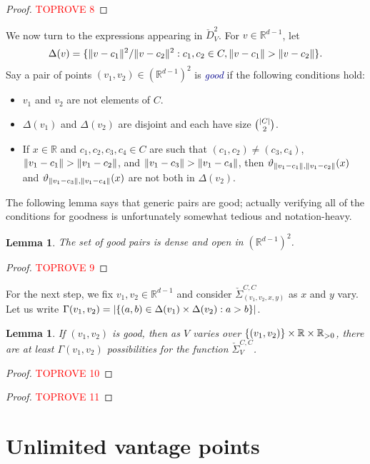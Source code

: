 \documentclass[11pt]{amsart}
\newtheorem{lemma}[theorem]{Lemma}
\theoremstyle{definition}
\DeclarePairedDelimiter{\set}{\{}{\}}
\DeclarePairedDelimiter{\abs}{\lvert}{\rvert}
\DeclarePairedDelimiter{\Abs}{\lVert}{\rVert}
\newcommand{\RR}{\mathbb{R}}
\newcommand{\dfn}[1]{\textcolor{darkblue}{\emph{#1}}}
\begin{document}
\begin{proof}\textcolor{red}{TOPROVE 8}\end{proof}

We now turn to the expressions appearing in $\check D^2_V$.  For $v \in \RR^{d-1}$, let \[\Delta(v) = \set{\Abs{v - c_1}^2/\Abs{v - c_2}^2 : c_1, c_2 \in C, \Abs{v - c_1} > \Abs{v - c_2}}.\] 
Say a pair of points $(v_1, v_2) \in (\RR^{d-1})^2$ is \dfn{good} if the following conditions hold:
\begin{itemize}
    \item $v_1$ and $v_2$ are not elements of $C$.
    \item $\Delta(v_1)$ and $\Delta(v_2)$ are disjoint and each have size $\binom{\abs{C}}{2}$.
    \item If $x \in \RR$ and $c_1, c_2, c_3, c_4 \in C$ are such that $(c_1,c_2) \neq (c_3,c_4)$, $\Abs{v_1 - c_1} > \Abs{v_1 - c_2}$, and $\Abs{v_1 - c_3} > \Abs{v_1 - c_4}$, then $\vartheta_{\Abs{v_1 - c_1},\Abs{v_1 - c_2}}(x)$ and $\vartheta_{\Abs{v_1 - c_3},\Abs{v_1 - c_4}}(x)$ are not both in $\Delta(v_2)$. 
\end{itemize}
The following lemma says that generic pairs are good; actually verifying all of the conditions for goodness is unfortunately somewhat tedious and notation-heavy.
\begin{lemma} \label{lem:denseopen}
The set of good pairs is dense and open in $(\RR^{d-1})^2$.
\end{lemma}
\begin{proof}\textcolor{red}{TOPROVE 9}\end{proof}

For the next step, we fix $v_1, v_2 \in \RR^{d-1}$ and consider $\check \Sigma^{C,C}_{(v_1,v_2,x,y)}$ as $x$ and $y$ vary. Let us write $\Gamma(v_1,v_2)= \abs{\set{(a,b)\in \Delta(v_1) \times \Delta(v_2) : a > b}}$.
\begin{lemma} \label{lem:gdd}
If $(v_1, v_2)$ is good, then as $V$ varies over $\set{(v_1,v_2)} \times \RR \times \RR_{>0}$, there are at least $\Gamma(v_1, v_2)$ possibilities for the function $\check \Sigma^{C,C}_V$.
\end{lemma}
\begin{proof}\textcolor{red}{TOPROVE 10}\end{proof}


\begin{proof}\textcolor{red}{TOPROVE 11}\end{proof}

\section{Unlimited vantage points}\label{sec:unlimited}
\end{document}
